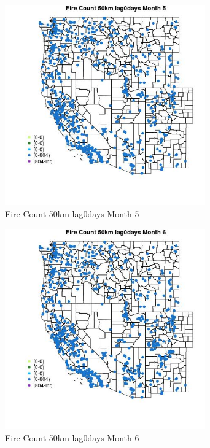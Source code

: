 \begin{figure} 
\centering  
\includegraphics[width=0.77\textwidth]{Code_Outputs/Report_ML_input_PM25_Step4_part_f_de_duplicated_aves_prioritize_24hr_obswNAs_MapObsMo5Fire_Count_50km_lag0days.jpg} 
\caption{\label{fig:Report_ML_input_PM25_Step4_part_f_de_duplicated_aves_prioritize_24hr_obswNAsMapObsMo5Fire_Count_50km_lag0days}Fire Count 50km lag0days Month 5} 
\end{figure} 
 

\clearpage 

\begin{figure} 
\centering  
\includegraphics[width=0.77\textwidth]{Code_Outputs/Report_ML_input_PM25_Step4_part_f_de_duplicated_aves_prioritize_24hr_obswNAs_MapObsMo6Fire_Count_50km_lag0days.jpg} 
\caption{\label{fig:Report_ML_input_PM25_Step4_part_f_de_duplicated_aves_prioritize_24hr_obswNAsMapObsMo6Fire_Count_50km_lag0days}Fire Count 50km lag0days Month 6} 
\end{figure} 
 

